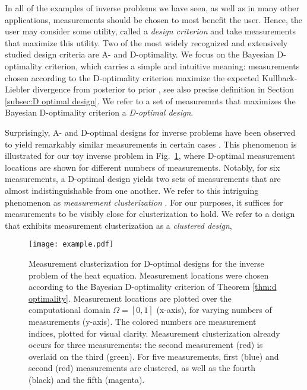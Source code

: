 In all of the examples of inverse problems we have seen, as well as in
many other applications, measurements should be chosen to most benefit
the user. Hence, the user may consider some utility, called a
\emph{design criterion} and take measurements that maximize this
utility. Two of the most widely recognized and extensively studied
design criteria are A- and D-optimality. We focus on the Bayesian
D-optimality criterion, which carries a simple and intuitive meaning:
measurements chosen according to the D-optimality criterion maximize
the expected Kullback-Liebler divergence from posterior to prior
\cite{Chaloner1995, AlexanderianGloorGhattas14}, see also precise
definition in Section \ref{subsec:D optimal design}. We refer to a set
of measuremnts that maximizes the Bayesian D-optimality criterion a
\emph{D-optimal design}.


Surprisingly, A- and D-optimal designs for inverse problems have been
observed to yield remarkably similar measurements in certain cases
\cite{fedorov1996, nyberg2012, fedorov1997, Ucinski05,
  neitzel2019sparse}. This phenomenon is illustrated for our toy
inverse problem in Fig.~\ref{fig:clusterization illustration}, where
D-optimal measurement locations are shown for different numbers of
measurements. Notably, for six measurements, a D-optimal design yields
two sets of measurements that are almost indistinguishable from one
another. We refer to this intriguing phenomenon as \emph{measurement
clusterization} \cite{Ucinski05}. For our purposes, it suffices for
measurements to be visibly close for clusterization to hold. We refer
to a design that exhibits measurement clusterization as a
\emph{clustered design},


\begin{figure}
    \centering
    \texttt{[image: example.pdf]}
    \caption{Measurement clusterization for D-optimal designs for the
      inverse problem of the heat equation. Measurement locations were
      chosen according to the Bayesian D-optimality criterion of
      Theorem \ref{thm:d optimality}. Measurement locations are
      plotted over the computational domain \(\Omega = [0, 1]\)
      (x-axis), for varying numbers of measurements (y-axis). The
      colored numbers are measurement indices, plotted for visual
      clarity. Measurement clusterization already occurs for three
      measurements: the second measurement (red) is overlaid on the
      third (green). For five measurements, first (blue) and second
      (red) measurements are clustered, as well as the fourth (black)
      and the fifth (magenta).}
  \label{fig:clusterization illustration}
\end{figure}

